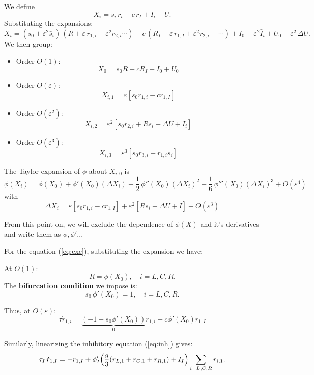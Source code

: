 \documentclass[ENG]{fancynotes}
\begin{document}
We define
\begin{equation}
  X_i = s_i\,r_i - c\,r_I + I_i + U.
  \label{eq:argument}
\end{equation}
Substituting the expansions:
\[
X_i = (s_0+ \varepsilon^2 \bar{s}_i)\,(R + \varepsilon\,r_{1,i} +\varepsilon^2 r_{2,i} \cdots) - c\,(R_I + \varepsilon\,r_{1,I}+\varepsilon^2 r_{2,i} +\cdots) + I_0 +\varepsilon^2 \bar{I}_i + U_0 + \varepsilon^2\,\Delta U.
\]
We then group:
\begin{itemize}
  \item Order \(O(1)\):
    \[
X_0 = s_0 R - c R_I +I_0 + U_0
    \]
  \item Order \(O(\varepsilon)\):
    \[
   X_{i,1} = \varepsilon [s_0 r_{1,i}- cr_{1,I}]
    \]
  \item Order \(O(\varepsilon^2)\): 
\[
X_{i,2} = \varepsilon^2 [s_0 r_{2,i}+ R\bar{s_i} + \Delta U + \bar{I_i}]
\]
  \item Order \(O(\varepsilon^3)\): 
\[
X_{i,3} = \varepsilon^3 [s_0 r_{3,i}+ r_{1,i}\bar{s_i}]
\]
\end{itemize}






The Taylor expansion of \(\phi\) about \(X_{i,0}\) is
\begin{equation}
\phi(X_i) = \phi(X_0) + \phi'(X_0) (\Delta X_i) + \frac{1}{2}\,\phi''(X_0) (\Delta X_i)^2 +\frac{1}{6}\,\phi'''(X_0) (\Delta X_i)^3+ O(\varepsilon^4)
\label{eq:taylor_exp}
\end{equation}
with
\[
\Delta X_i = \varepsilon [s_0 r_{1,i}- cr_{1,I}] + \varepsilon^2[R\bar{s}_i + \Delta U + \bar{I}] + O(\varepsilon^3)
\]


From this point on, we will exclude the dependence of $\phi(X)$ and it's derivatives and write them as $\phi, \phi'...$


For the equation (\ref{eq:exc}), substituting the expansion we have:


At \(O(1)\):
\[
R = \phi(X_{0}), \quad i=L,C,R.
\]
The \textbf{bifurcation condition} we impose is:
\begin{equation}
  s_0\,\phi'(X_{0}) = 1, \quad i=L,C,R.
  \label{eq:bifurcation_condition}
\end{equation}


Thus, at \(O(\varepsilon)\):
\[
\tau \dot{r}_{1,i} = \underbrace{(-1+s_{0} \phi'(X_0))}_0 r_{1,i} - c\phi'(X_0)r_{1,I}
\]




Similarly, linearizing the inhibitory equation (\ref{eq:inh}) gives:
\begin{equation}
  \tau_I\,\dot{r}_{1,I} = -r_{1,I} + \phi_I'\Bigl(\frac{g}{3}(r_{L,1}+r_{C,1}+r_{R,1})+I_I\Bigr)\sum_{i=L,C,R}r_{i,1}.
  \label{eq:order1_inhibitory}
\end{equation}
\end{document}
